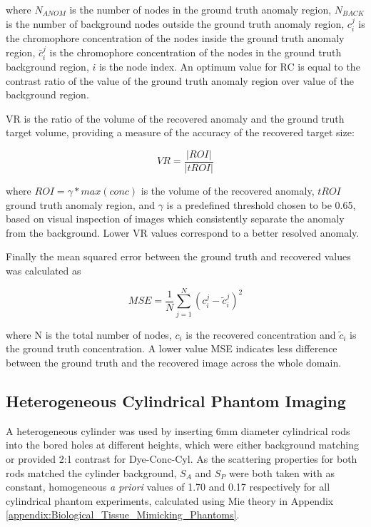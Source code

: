 \documentclass[twoside]{bhamthesis}
\theoremstyle{definition}
\begin{document}
where $N_{ANOM}$ is the number of nodes in the ground truth anomaly region, $N_{BACK}$ is the number of background nodes outside the ground truth anomaly region, ${c}^j_i$ is the chromophore concentration of the nodes inside the ground truth anomaly region, $\bar{c}^j_i$ is the chromophore concentration of the nodes in the ground truth background region, $i$ is the node index. An optimum value for RC is equal to the contrast ratio of the value of the ground truth anomaly region over value of the background region. 

VR is the ratio of the volume of the recovered anomaly and the ground truth target volume, providing a measure of the accuracy of the recovered target size:

\begin{equation}
\label{eq:Volume ratio}
VR= \frac{\vert ROI \vert}{\vert tROI \vert}
\end{equation}

where $ROI = \gamma*max(conc)$ is the volume of the recovered anomaly, $tROI$ ground truth anomaly region, and $\gamma$ is a predefined threshold chosen to be 0.65, based on visual inspection of images which consistently separate the anomaly from the background. Lower VR values correspond to a better resolved anomaly.

Finally the mean squared error between the ground truth and recovered values was calculated as

\begin{equation}
\label{eq:Mean squared error}
MSE= \frac{1}{N}\sum_{j=1}^{N}\left(c^j_i - \tilde{c}^j_i \right)^2
\end{equation}

where N is the total number of nodes, $c_i$ is the recovered concentration and $\tilde{c}_i$ is the ground truth concentration. A lower value MSE indicates less difference between the ground truth and the recovered image across the whole domain. 

\subsection{Heterogeneous Cylindrical Phantom Imaging}

\label{Heterogeneous Cylindrical Phantom Imaging}

A heterogeneous cylinder was used by inserting 6mm diameter cylindrical rods into the bored holes at different heights, which were either background matching or provided 2:1 contrast for Dye-Conc-Cyl. As the scattering properties for both rods matched the cylinder background, $S_A$ and $S_P$ were both taken with as constant, homogeneous \textit{a priori} values of 1.70 and 0.17 respectively for all cylindrical phantom experiments, calculated using Mie theory in Appendix \ref{appendix:Biological_Tissue_Mimicking_Phantoms}.
\end{document}
